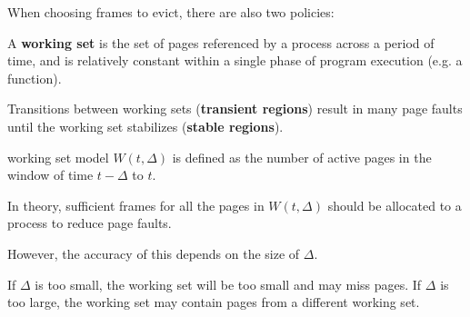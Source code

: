 When choosing frames to evict, there are also two policies:
\begin{enumerate*}
\end{enumerate*}

A \textbf{working set} is the set of pages referenced by a process across a period of time, and is relatively constant within a single phase of program execution (e.g. a function).

Transitions between working sets (\textbf{transient regions}) result in many page faults until the working set stabilizes (\textbf{stable regions}).

\begin{defn}{working set model}
    $W(t, \Delta)$ is defined as the number of active pages in the window of time $t - \Delta$ to $t$.

    In theory, sufficient frames for all the pages in $W(t, \Delta)$ should be allocated to a process to reduce page faults.

    However, the accuracy of this depends on the size of $\Delta$.

    If $\Delta$ is too small, the working set will be too small and may miss pages.
    If $\Delta$ is too large, the working set may contain pages from a different working set.
\end{defn}